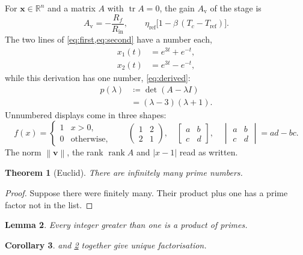 \documentclass[11pt,a4paper]{article}   %
\numberwithin{equation}{section}
\numberwithin{figure}{section}
\numberwithin{table}{section}
\theoremstyle{plain}                    %
\newtheorem{theorem}{Theorem}[section]
\newtheorem{lemma}[theorem]{Lemma}
\newtheorem{corollary}[theorem]{Corollary}
\theoremstyle{definition}               %
\theoremstyle{remark}                   %
\newcommand{\R}{\mathbb{R}}
\newcommand{\vect}[1]{\mathbf{#1}}
\newcommand{\abs}[1]{\left| #1 \right|}
\newcommand{\gain}{A_\mathrm{v}}
\DeclareMathOperator{\tr}{tr}
\begin{document}
For $\vect{x} \in \R^n$ and a matrix $A$ with $\tr A = 0$, the gain $\gain$ of the stage is
\begin{equation}\label{eq:gain}
  \gain = -\frac{R_f}{R_\mathrm{in}}, \qquad \eta_{\text{ref}} \bigl[ 1 - \beta \, (T_c - T_{\text{ref}}) \bigr].
\end{equation}
The two lines of \cref{eq:first,eq:second} have a number each,
\begin{align}
  x_1(t) &= e^{3t} + e^{-t}, \label{eq:first} \\
  x_2(t) &= e^{3t} - e^{-t}, \label{eq:second}
\end{align}
while this derivation has one number, \eqref{eq:derived}:
\begin{align}
  p(\lambda) &\coloneqq \det(A - \lambda I) \nonumber \\
             &= (\lambda - 3)(\lambda + 1). \label{eq:derived}
\end{align}
Unnumbered displays come in three shapes:
\[
  f(x) = \begin{cases} 1 & x > 0, \\ 0 & \text{otherwise}, \end{cases} \qquad
  \begin{pmatrix} 1 & 2 \\ 2 & 1 \end{pmatrix}, \quad
  \begin{bmatrix} a & b \\ c & d \end{bmatrix}, \quad
  \begin{vmatrix} a & b \\ c & d \end{vmatrix} = ad - bc.
\]
The norm $\left\lVert \vect{v} \right\rVert$, the rank $\operatorname{rank} A$ and $\abs{x - 1}$
read as written.

\begin{theorem}[Euclid]\label{thm:euclid}
There are infinitely many prime numbers.
\end{theorem}

\begin{proof}
Suppose there were finitely many. Their product plus one has a prime factor not in the list.
\end{proof}

\begin{lemma}\label{lem:split}
Every integer greater than one is a product of primes.
\end{lemma}

\begin{corollary}\label{cor:many}
 and \cref{lem:split} together give unique factorisation.
\end{corollary}
\end{document}
